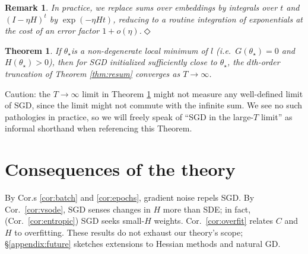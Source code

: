 \documentclass[anon,12pt]{colt2021} %
\newtheorem{thm}{Theorem}
\newtheorem{rmk}{Remark}
\newcommand{\mend}{\hfill $\Diamond$}
\begin{document}
     
            \begin{rmk} \label{rmk:integrate}
                \emph{In practice, we replace sums over embeddings by
                integrals over $t$ and $(I-\eta H)^t$ by $\exp(- \eta H t)$,
                reducing to a routine integration of exponentials at the cost
                of an error factor $1 + o(\eta)$.}\mend
            \end{rmk}
    
     
            \begin{thm} \label{thm:converge}
                If $\theta_\star$is a non-degenerate local minimum of $l$
                (i.e.\ $G(\theta_\star)=0$ and $H(\theta_\star) > 0$), then for
                SGD initialized sufficiently close to $\theta_\star$, the
                $d$th-order truncation of Theorem \ref{thm:resum} converges as
                $T\to \infty$.
            \end{thm}
            \par\noindent
            Caution: the $T\to \infty$ limit in Theorem \ref{thm:converge}
            might not measure any well-defined limit of SGD, since the limit
            might not commute with the infinite sum.  We see no such
            pathologies in practice, so we will freely speak of ``SGD in the
            large-$T$ limit'' as informal shorthand when referencing this
            Theorem.

    \section{Consequences of the theory}\label{sect:consequences}

        By Cor.s \ref{cor:batch} and \ref{cor:epochs}, gradient noise repels SGD.
        By Cor.\ \ref{cor:vsode}, SGD senses changes in $H$ more than
            SDE; in fact, (Cor.\ \ref{cor:entropic}) SGD seeks small-$H$
            weights.
        Cor.\ \ref{cor:overfit} relates
            $C$ and $H$ to overfitting.  These
            results do not exhaust our theory's scope;
            \S\ref{appendix:future} sketches 
            extensions to Hessian methods and natural GD.
\end{document}
